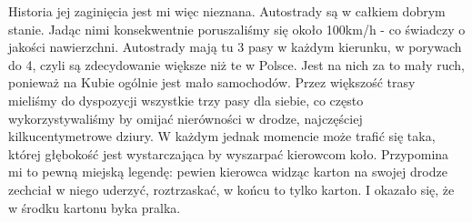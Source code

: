 Historia jej zaginięcia jest mi więc nieznana.
Autostrady są w całkiem dobrym stanie.
Jadąc nimi konsekwentnie poruszaliśmy się około 100km/h - co świadczy o jakości nawierzchni.
Autostrady mają tu 3 pasy w każdym kierunku, w porywach do 4, czyli są zdecydowanie większe niż te w Polsce.
Jest na nich za to mały ruch, ponieważ na Kubie ogólnie jest mało samochodów.
Przez większość trasy mieliśmy do dyspozycji wszystkie trzy pasy dla siebie, co często wykorzystywaliśmy by omijać nierówności w drodze, najczęściej kilkucentymetrowe dziury.
W każdym jednak momencie może trafić się taka, której głębokość jest wystarczająca by wyszarpać kierowcom koło.
Przypomina mi to pewną miejską legendę: pewien kierowca widząc karton na swojej drodze zechciał w niego uderzyć, roztrzaskać, w końcu to tylko karton.
I okazało się, że w środku kartonu byka pralka. 


